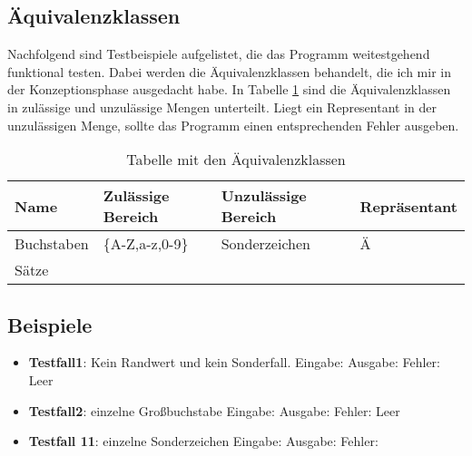 \subsection{Äquivalenzklassen}
Nachfolgend sind Testbeispiele aufgelistet, die das Programm weitestgehend funktional testen. Dabei werden die Äquivalenzklassen behandelt, die ich mir in der Konzeptionsphase ausgedacht habe. In Tabelle \ref{tab:tests} sind die Äquivalenzklassen in zulässige und unzulässige Mengen unterteilt. Liegt ein Representant in der unzulässigen Menge, sollte das Programm einen entsprechenden Fehler ausgeben. 

\begin{table}[H]
\begin{tabular}{|l|l|l|l|}
\hline
Name & Zulässige  Bereich & Unzulässige Bereich & Repräsentant \\ \hline
   Buchstaben  &  \{A-Z,a-z,0-9\}                  &     Sonderzeichen                &  Ä            \\ \hline
    Sätze &                    &                    &              \\ \hline
\end{tabular}
\caption{Tabelle mit den Äquivalenzklassen}
\label{tab:tests}
\end{table}


\subsection{Beispiele}
\begin{itemize}
\item \textbf{Testfall1}: Kein Randwert und kein Sonderfall.
Eingabe: 
Ausgabe: 
Fehler: Leer

\item \textbf{Testfall2}: einzelne Großbuchstabe
Eingabe: 
Ausgabe: 
Fehler: Leer

\item \textbf{Testfall 11}: einzelne Sonderzeichen
Eingabe: 
Ausgabe: 
Fehler:

\end{itemize}


